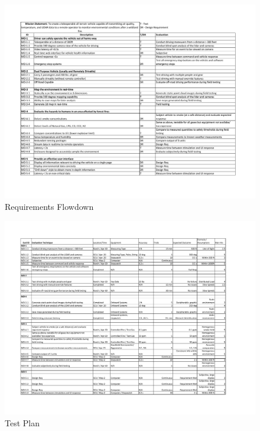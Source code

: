 \begin{figure}[H]
	\centerline{\includegraphics[height=1.0\linewidth,angle=90]{ReqFlow.pdf}}
	\caption{Requirements Flowdown}
\end{figure}

\begin{figure}[H]
	\centerline{\includegraphics[width=1.0\linewidth,angle=90]{TestPlan.pdf}}
	\caption{Test Plan}
\end{figure}

